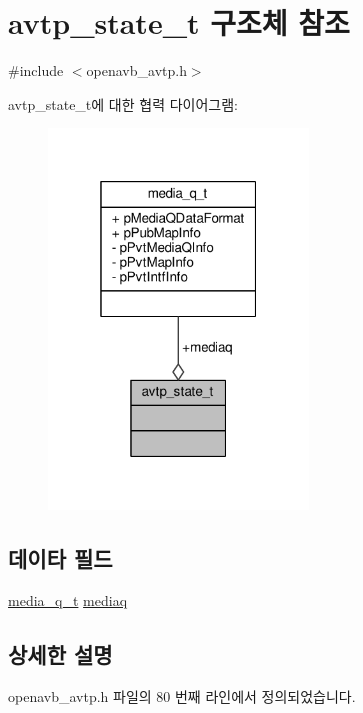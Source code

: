 \hypertarget{structavtp__state__t}{}\section{avtp\+\_\+state\+\_\+t 구조체 참조}
\label{structavtp__state__t}


{\ttfamily \#include $<$openavb\+\_\+avtp.\+h$>$}



avtp\+\_\+state\+\_\+t에 대한 협력 다이어그램\+:
\nopagebreak
\begin{figure}[H]
\begin{center}
\leavevmode
\includegraphics[width=196pt]{structavtp__state__t__coll__graph}
\end{center}
\end{figure}
\subsection*{데이타 필드}
\begin{DoxyCompactItemize}
\item 
\hyperlink{structmedia__q__t}{media\+\_\+q\+\_\+t} \hyperlink{structavtp__state__t_a819df779bef725f318d02f2d250c0ceb}{mediaq}
\end{DoxyCompactItemize}


\subsection{상세한 설명}


openavb\+\_\+avtp.\+h 파일의 80 번째 라인에서 정의되었습니다.



